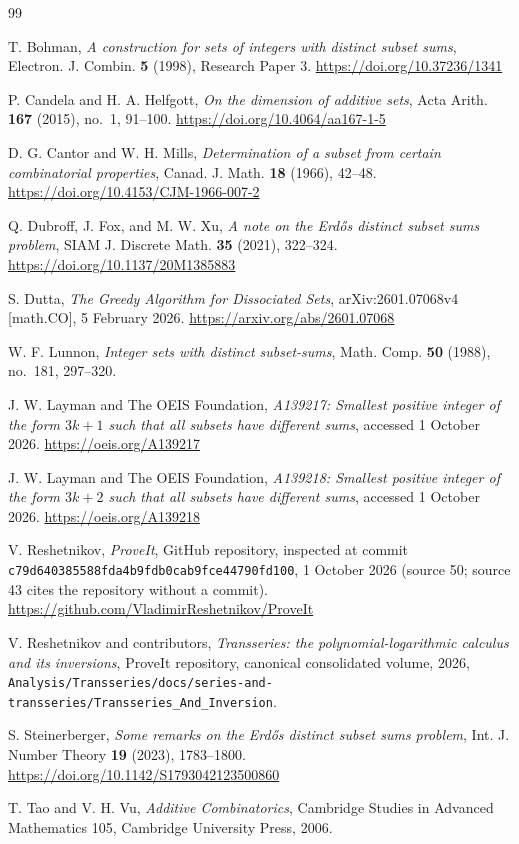 \documentclass[11pt,a4paper]{article}
\numberwithin{equation}{section}
\theoremstyle{definition}
\theoremstyle{remark}
\theoremstyle{plain}
\begin{document}
\begin{thebibliography}{99}

T. Bohman,
\emph{A construction for sets of integers with distinct subset sums},
Electron. J. Combin. \textbf{5} (1998), Research Paper 3.
\url{https://doi.org/10.37236/1341}

P. Candela and H. A. Helfgott,
\emph{On the dimension of additive sets},
Acta Arith. \textbf{167} (2015), no.~1, 91--100.
\url{https://doi.org/10.4064/aa167-1-5}

D. G. Cantor and W. H. Mills,
\emph{Determination of a subset from certain combinatorial properties},
Canad. J. Math. \textbf{18} (1966), 42--48.
\url{https://doi.org/10.4153/CJM-1966-007-2}

Q. Dubroff, J. Fox, and M. W. Xu,
\emph{A note on the Erd\H{o}s distinct subset sums problem},
SIAM J. Discrete Math. \textbf{35} (2021), 322--324.
\url{https://doi.org/10.1137/20M1385883}

S. Dutta,
\emph{The Greedy Algorithm for Dissociated Sets},
arXiv:2601.07068v4 [math.CO], 5 February 2026.
\url{https://arxiv.org/abs/2601.07068}

W. F. Lunnon,
\emph{Integer sets with distinct subset-sums},
Math. Comp. \textbf{50} (1988), no.~181, 297--320.

J. W. Layman and The OEIS Foundation,
\emph{A139217: Smallest positive integer of the form $3k+1$ such that all
subsets have different sums}, accessed 1 October 2026.
\url{https://oeis.org/A139217}

J. W. Layman and The OEIS Foundation,
\emph{A139218: Smallest positive integer of the form $3k+2$ such that all
subsets have different sums}, accessed 1 October 2026.
\url{https://oeis.org/A139218}

V. Reshetnikov,
\emph{ProveIt}, GitHub repository, inspected at commit
\nolinkurl{c79d640385588fda4b9fdb0cab9fce44790fd100}, 1 October 2026
(source 50; source 43 cites the repository without a commit).
\url{https://github.com/VladimirReshetnikov/ProveIt}

V. Reshetnikov and contributors,
\emph{Transseries: the polynomial-logarithmic calculus and its inversions},
ProveIt repository, canonical consolidated volume, 2026,
\nolinkurl{Analysis/Transseries/docs/series-and-transseries/Transseries_And_Inversion}.

S. Steinerberger,
\emph{Some remarks on the Erd\H{o}s distinct subset sums problem},
Int. J. Number Theory \textbf{19} (2023), 1783--1800.
\url{https://doi.org/10.1142/S1793042123500860}

T. Tao and V. H. Vu,
\emph{Additive Combinatorics},
Cambridge Studies in Advanced Mathematics 105,
Cambridge University Press, 2006.

\end{thebibliography}
\end{document}

